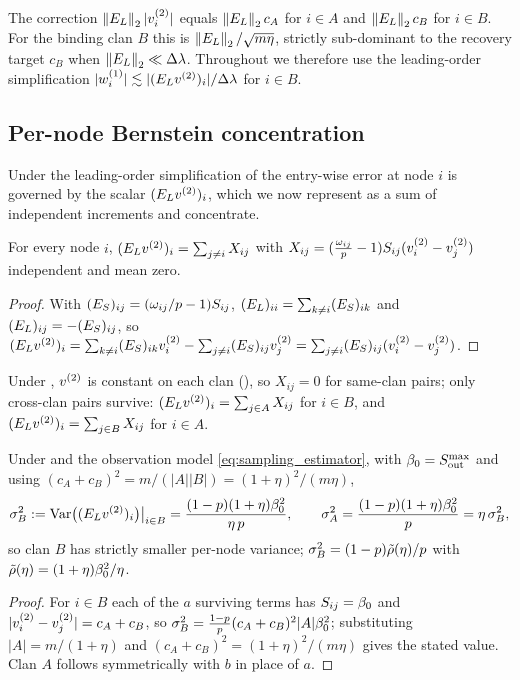 \begin{remark}\label{rem:C-asym}
The correction $\left\lVert E_{L} \right\rVert_{2}|v^{(2)}_i|$ equals $\left\lVert E_{L} \right\rVert_{2}c_A$ for $i\in A$ and
$\left\lVert E_{L} \right\rVert_{2}c_B$ for $i\in B$. For the binding clan $B$ this is
$\left\lVert E_{L} \right\rVert_{2}/\sqrt{m\eta}$, strictly sub-dominant to the recovery target $c_B$
when $\left\lVert E_{L} \right\rVert_{2}\ll\Delta\lambda$. Throughout  we therefore use the
leading-order simplification $|w^{(1)}_i|\lesssim|(E_{L}v^{(2)})_i|/\Delta\lambda$ for $i\in B$.
\end{remark}

\subsection{Per-node Bernstein concentration}\label{app:comp3b}

Under the leading-order simplification of  the entry-wise error
at node $i$ is governed by the scalar $(E_{L}v^{(2)})_i$, which we now represent as a
sum of independent increments and concentrate.

\begin{lemma}\label{lem:C-inc}
For every node $i$, $(E_{L}v^{(2)})_i=\sum_{j\ne i}X_{ij}$ with
$X_{ij}=(\tfrac{\omega_{ij}}{p}-1)S_{ij}(v^{(2)}_i-v^{(2)}_j)$ independent and mean zero.
\end{lemma}
\begin{proof}
With $(E_{S})_{ij}=(\omega_{ij}/p-1)S_{ij}$, $(E_{L})_{ii}=\sum_{k\ne i}(E_{S})_{ik}$ and
$(E_{L})_{ij}=-(E_{S})_{ij}$, so
$(E_{L}v^{(2)})_i=\sum_{k\ne i}(E_{S})_{ik}v^{(2)}_i-\sum_{j\ne i}(E_{S})_{ij}v^{(2)}_j
=\sum_{j\ne i}(E_{S})_{ij}(v^{(2)}_i-v^{(2)}_j)$.
\end{proof}

\begin{proposition}\label{prop:C-within}
Under , $v^{(2)}$ is constant on each clan (), so
$X_{ij}=0$ for same-clan pairs; only cross-clan pairs survive:
$(E_{L}v^{(2)})_i=\sum_{j\in A}X_{ij}$ for $i\in B$, and
$(E_{L}v^{(2)})_i=\sum_{j\in B}X_{ij}$ for $i\in A$.
\end{proposition}

\begin{proposition}\label{prop:C-var}
Under  and the observation model \eqref{eq:sampling_estimator}, with
$\beta_0=S_{\mathrm{out}}^{\max}$ and using
$(c_A+c_B)^2=m/(|A||B|)=(1+\eta)^2/(m\eta)$,
\begin{equation}
   \sigma_B^2:=\operatorname{Var}\bigl((E_{L}v^{(2)})_i\bigr)\big|_{i\in B}
   =\frac{(1-p)(1+\eta)\beta_0^2}{\eta\,p},
   \qquad
   \sigma_A^2=\frac{(1-p)(1+\eta)\beta_0^2}{p}=\eta\,\sigma_B^2,
\end{equation}
so clan $B$ has strictly smaller per-node variance;
$\sigma_B^2=(1-p)\tilde\rho(\eta)/p$ with $\tilde\rho(\eta)=(1+\eta)\beta_0^2/\eta$.
\end{proposition}
\begin{proof}
For $i\in B$ each of the $a$ surviving terms has $S_{ij}=\beta_0$ and
$|v^{(2)}_i-v^{(2)}_j|=c_A+c_B$, so $\sigma_B^2=\tfrac{1-p}{p}(c_A+c_B)^2|A|\beta_0^2$;
substituting $|A|=m/(1+\eta)$ and $(c_A+c_B)^2=(1+\eta)^2/(m\eta)$ gives the stated
value. Clan $A$ follows symmetrically with $b$ in place of $a$.
\end{proof}

